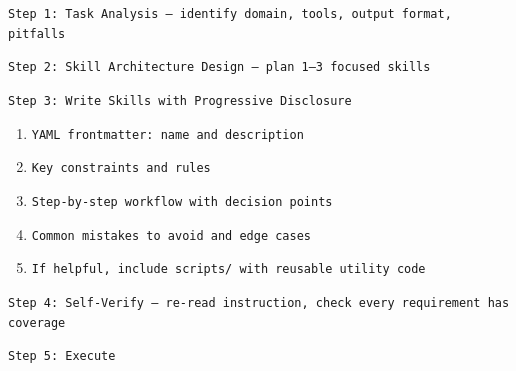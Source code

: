 \documentclass{article}
\begin{document}
\begin{tcolorbox}[colback=takeawayback, colframe=takeawayframe, title=\textbf{CoT-Guided Self-Generation Prompt}, fonttitle=\small, fontupper=\small]
\texttt{Step 1: Task Analysis --- identify domain, tools, output format, pitfalls}

\texttt{Step 2: Skill Architecture Design --- plan 1--3 focused skills}

\texttt{Step 3: Write Skills with Progressive Disclosure}
\begin{enumerate}
\item[(a)] \texttt{YAML frontmatter: name and description}
\item[(b)] \texttt{Key constraints and rules}
\item[(c)] \texttt{Step-by-step workflow with decision points}
\item[(d)] \texttt{Common mistakes to avoid and edge cases}
\item[(e)] \texttt{If helpful, include scripts/ with reusable utility code}
\end{enumerate}

\texttt{Step 4: Self-Verify --- re-read instruction, check every requirement has coverage}

\texttt{Step 5: Execute}
\end{tcolorbox}
\end{document}
